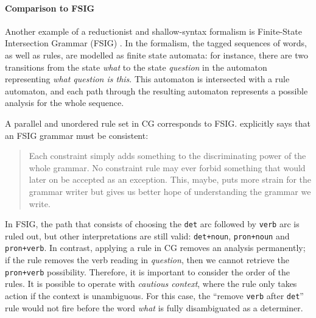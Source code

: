 % 
% 
% 
% 
% 
\paragraph{Comparison to FSIG} 
Another example of a reductionist and shallow-syntax formalism is
Finite-State Intersection Grammar (FSIG) \citep{koskenniemi90}. In the
formalism, the tagged sequences of words, as well as rules, are modelled
as finite state automata: for instance, there are two transitions from
the state \emph{what} to the state \emph{question} in the automaton
representing \emph{what question is this}. This automaton is intersected with
a rule automaton, and each path through the resulting automaton
represents a possible analysis for the whole sequence.
 
A parallel and unordered rule set in CG corresponds to FSIG.
\cite{koskenniemi90} explicitly says that an FSIG grammar must be
consistent:
 
 \begin{quote}
 Each constraint simply adds something to the discriminating power of the
 whole grammar. No constraint rule may ever forbid something that would
 later on be accepted as an exception. This, maybe, puts more strain for
 the grammar writer but gives us better hope of understanding the grammar
 we write.
 \end{quote}


In FSIG, the path that consists of choosing the \texttt{det} arc
followed by \texttt{verb} arc is ruled out, but other interpretations
are still valid: \texttt{det+noun}, \texttt{pron+noun} and
\texttt{pron+verb}. In contrast, applying a rule in CG removes an
analysis permanently; if the rule removes the verb reading in
\emph{question}, then we cannot retrieve the \texttt{pron+verb}
possibility. Therefore, it is important to consider the order of the
rules. It is possible to operate with \emph{cautious context}, where the
rule only takes action if the context is unambiguous. For this case, the
``remove \texttt{verb} after \texttt{det}'' rule would not fire before
the word \emph{what} is fully disambiguated as a determiner.



